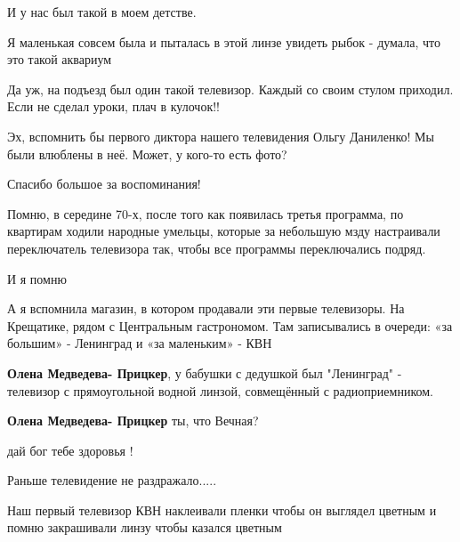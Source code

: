 \begin{itemize}

И у нас был такой в моем детстве.


Я маленькая совсем была и пыталась в этой линзе увидеть рыбок - думала, что это
такой аквариум


Да уж, на подъезд был один такой телевизор.
Каждый со своим стулом приходил.
Если не сделал уроки, плач в кулочок!!


Эх, вспомнить бы первого диктора нашего телевидения Ольгу Даниленко! Мы были
влюблены в неё. Может, у кого-то есть фото?


Спасибо большое за воспоминания!

Помню, в середине 70-х, после того как появилась третья программа, по квартирам
ходили народные умельцы, которые за небольшую мзду настраивали переключатель
телевизора так, чтобы все программы переключались подряд.

\begin{itemize} %
И я помню
\end{itemize} %


А я вспомнила магазин, в котором продавали эти первые телевизоры. На
Крещатике, рядом с Центральным гастрономом. Там записывались в очереди: «за
большим» - Ленинград и «за маленьким» - КВН

\begin{itemize} %
\textbf{Олена Медведева- Прицкер}, у бабушки с дедушкой был "Ленинград" - телевизор с прямоугольной водной линзой, совмещённый с радиоприемником.

\textbf{Олена Медведева- Прицкер} ты, что Вечная?

дай бог тебе здоровья !
\end{itemize} %


Раньше телевидение не раздражало.....


Наш первый телевизор КВН наклеивали пленки чтобы он выглядел цветным и помню
закрашивали линзу чтобы казался цветным



\end{itemize}
